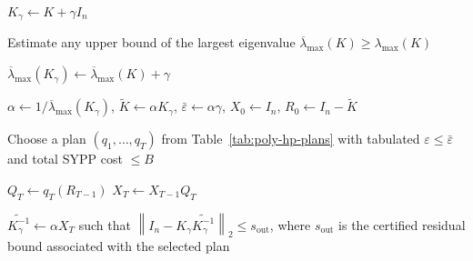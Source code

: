 \documentclass[11pt]{article}
\begin{document}
\begin{algorithm}[htb]
\caption{Inverse of ${K}_\gamma={K}+\gamma{I}_n$ via polynomial approximation}
\label{alg:poly-right-precond}
\DontPrintSemicolon


${K}_\gamma \gets {K}+\gamma{I}_n$\;

Estimate any upper bound of the largest eigenvalue $\overline{\lambda}_{\max}({K})\ge \lambda_{\max}({K})$\;

$\overline{\lambda}_{\max}({K}_\gamma)\gets \overline{\lambda}_{\max}({K})+\gamma$\;

$\alpha \gets 1/\overline{\lambda}_{\max}({K}_\gamma)$,\quad
$\widetilde{{K}} \gets \alpha {K}_\gamma$,\quad
$\bar{\varepsilon} \gets \alpha \gamma$,\quad
${X}_0 \gets {I}_n$,\quad
${R}_0 \gets {I}_n-\widetilde{{K}}$\;

Choose a plan $(q_1,\dots,q_T)$ from Table~\ref{tab:poly-hp-plans} with tabulated $\varepsilon\le \bar{\varepsilon}$ and total SYPP cost $\le B$\;


${Q}_T \gets q_T({R}_{T-1})$\;
${X}_T \gets {X}_{T-1} {Q}_T$\;

\Return $\widetilde{{K}_\gamma^{-1}} \gets \alpha {X}_T$ such that $\left\|{I}_n-{K}_\gamma \widetilde{{K}_\gamma^{-1}}\right\|_2\le s_{\mathrm{out}}$, where $s_{\mathrm{out}}$ is the certified residual bound associated with the selected plan\;
\end{algorithm}
\end{document}
